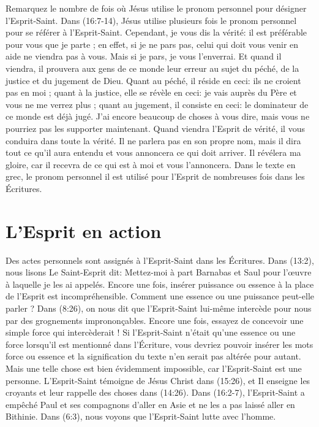 Remarquez le nombre de fois où Jésus utilise le pronom personnel pour
 désigner l'Esprit-Saint. Dans (16:7-14), Jésus utilise
 plusieurs fois le pronom personnel pour se référer à l'Esprit-Saint.
 \og Cependant, je vous dis la vérité\space: il est préférable pour vous que
 je parte ; en effet, si je ne pars pas, celui qui doit vous venir en aide
 ne viendra pas à vous. Mais si je pars, je vous l'enverrai. Et quand il
 viendra, il prouvera aux gens de ce monde leur erreur au sujet du péché,
 de la justice et du jugement de Dieu. Quant au péché, il réside en ceci\space:
 ils ne croient pas en moi ; quant à la justice, elle se révèle en ceci\space:
 je vais auprès du Père et vous ne me verrez plus ; quant au jugement,
 il consiste en ceci\space: le dominateur de ce monde est déjà jugé.
 J'ai encore beaucoup de choses à vous dire, mais vous ne pourriez pas les
 supporter maintenant. Quand viendra l'Esprit de vérité, il vous conduira
 dans toute la vérité. Il ne parlera pas en son propre nom, mais il dira tout
 ce qu'il aura entendu et vous annoncera ce qui doit arriver.
 Il révélera ma gloire, car il recevra de ce qui est à moi et vous
 l'annoncera.
 \fg{} Dans le texte en grec, le pronom personnel \og il \fg{} est utilisé
 pour l'Esprit de nombreuses fois dans les Écritures.

\section*{L'Esprit en action}

Des actes personnels sont assignés à l'Esprit-Saint dans les Écritures. Dans
 (13:2), nous lisons \og Le Saint-Esprit dit\space:
 Mettez-moi à part Barnabas et Saul pour l'œuvre à laquelle je les ai
 appelés. \fg{}
 Encore une fois, insérer \og puissance \fg{} ou \og essence \fg{} à la place
 de l'Esprit est incompréhensible. Comment une essence ou une puissance
 peut-elle parler ? Dans (8:26), on nous dit que l'Esprit-Saint
 lui-même intercède pour nous par des grognements imprononçables.
 Encore une fois, essayez de concevoir une simple force qui intercèderait !
 Si l'Esprit-Saint n'était qu'une essence ou une force lorsqu'il est mentionné
 dans l'Écriture, vous devriez pouvoir insérer les mots \og force \fg{} ou
 \og essence \fg{} et la signification du texte n'en serait pas altérée pour
 autant. Mais une telle chose est bien évidemment impossible, car
 l'Esprit-Saint est une personne. L'Esprit-Saint témoigne de Jésus Christ dans
 (15:26), et Il enseigne les croyants et leur rappelle des choses
 dans (14:26). Dans (16:2-7), l'Esprit-Saint a
 empêché Paul et ses compagnons d'aller en Asie et ne les a pas laissé aller
 en Bithinie. Dans (6:3), nous voyons que l'Esprit-Saint lutte
 avec l'homme.

